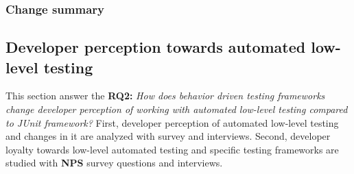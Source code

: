     \begin{table}[H]
            \caption {Unit testing practices and changes in them} \label{tab:changes-pt10}
    \end{table}

\subsubsection{Change summary}

\clearpage


\subsection{Developer perception towards automated low-level testing}
This section answer the
\textbf{RQ2: }\textit{How does behavior driven testing frameworks change developer perception of working with automated low-level
testing compared to JUnit framework?} First, developer perception of automated low-level testing and changes in it are
analyzed with survey and interviews. Second, developer loyalty towards low-level automated testing and specific testing
frameworks are studied with \textbf{NPS} survey questions and interviews.

